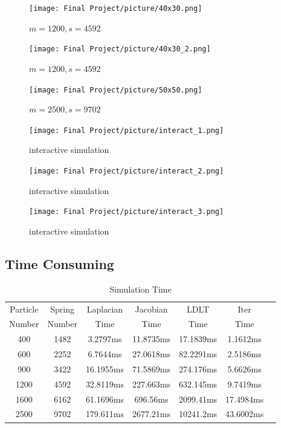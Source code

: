 \documentclass[acmtog]{acmart}
\begin{document}
\begin{figure}[H]
	\centering
	\texttt{[image: Final Project/picture/40x30.png]}
	\caption{$m = 1200, s = 4592$}
\end{figure}
\begin{figure}[H]
	\centering
	\texttt{[image: Final Project/picture/40x30\_2.png]}
	\caption{$m = 1200, s = 4592$}
\end{figure}
\begin{figure}[H]
	\centering
	\texttt{[image: Final Project/picture/50x50.png]}
	\caption{$m = 2500, s = 9702$}
\end{figure}
\begin{figure}[H]
	\centering
	\texttt{[image: Final Project/picture/interact\_1.png]}
	\caption{interactive simulation}
\end{figure}
\begin{figure}[H]
	\centering
	\texttt{[image: Final Project/picture/interact\_2.png]}
	\caption{interactive simulation}
\end{figure}
\begin{figure}[H]
	\centering
	\texttt{[image: Final Project/picture/interact\_3.png]}
	\caption{interactive simulation}
\end{figure}

\subsection{Time Consuming}

\begin{table}[h]
\centering
\caption{Simulation Time}
\label{tab:results}
\begin{tabular}{ccccccc}
\hline
Particle & Spring & Laplacian & Jacobian & LDLT & Iter \\
Number & Number & Time & Time & Time & Time \\
\hline
400 & 1482 & 3.2797ms & 11.8735ms & 17.1839ms & 1.1612ms \\
600 & 2252 & 6.7644ms & 27.0618ms & 82.2291ms & 2.5186ms \\
900 & 3422 & 16.1955ms & 71.5869ms & 274.176ms & 5.6626ms \\
1200 & 4592 & 32.8119ms & 227.663ms & 632.145ms & 9.7419ms \\
1600 & 6162 & 61.1696ms & 696.56ms & 2099.41ms & 17.4984ms \\
2500 & 9702 & 179.611ms & 2677.21ms & 10241.2ms & 43.6002ms \\
\hline
\end{tabular}
\end{table}
\end{document}

